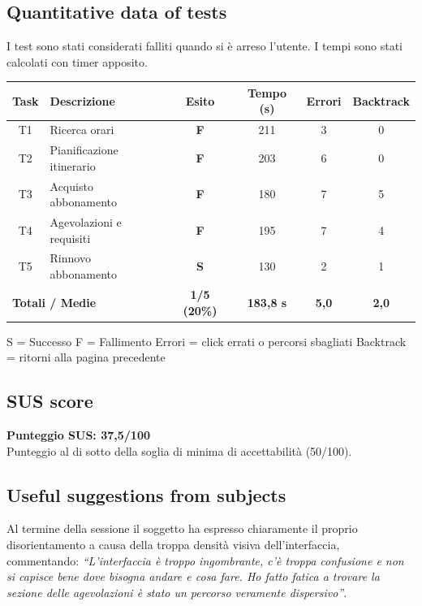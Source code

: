 ﻿\documentclass[11pt,a4paper]{article}
\begin{document}
\subsection*{Quantitative data of tests}
\begin{tcolorbox}[base]
I test sono stati considerati falliti quando si è arreso l'utente.
I tempi sono stati calcolati con timer apposito.
\begin{center}
\renewcommand{\arraystretch}{1.4}
\begin{tabular}{clcccc}
\toprule
\textbf{Task} & \textbf{Descrizione} &
\textbf{Esito} & \textbf{Tempo (s)} &
\textbf{Errori} & \textbf{Backtrack} \\
\midrule
T1 & Ricerca orari             & \textbf{F} & 211 & 3 & 0 \\
T2 & Pianificazione itinerario & \textbf{F} & 203 & 6 & 0 \\
T3 & Acquisto abbonamento      & \textbf{F} & 180 & 7 & 5 \\
T4 & Agevolazioni e requisiti  & \textbf{F} & 195 & 7 & 4 \\
T5 & Rinnovo abbonamento       & \textbf{S} & 130 & 2 & 1 \\
\midrule
\multicolumn{2}{l}{\textbf{Totali / Medie}} &
\textbf{1/5 (20\%)} & \textbf{183,8 s} &
\textbf{5,0} & \textbf{2,0} \\
\bottomrule
\end{tabular}
\end{center}

\vspace{0.3cm}
\small S = Successo \quad F = Fallimento \quad
Errori = click errati o percorsi sbagliati \quad
Backtrack = ritorni alla pagina precedente
\end{tcolorbox}

\subsection*{SUS score}
\begin{tcolorbox}[base]
\textbf{Punteggio SUS: 37,5/100}\\[0.2cm]
\small Punteggio al di sotto della soglia di minima di accettabilità
(50/100).
\end{tcolorbox}

\subsection*{Useful suggestions from subjects}
\begin{tcolorbox}[base]
Al termine della sessione il soggetto ha espresso chiaramente il proprio disorientamento a causa della troppa densità visiva dell'interfaccia, commentando:
\textit{``L'interfaccia è troppo ingombrante, c'è troppa confusione e non si capisce bene dove bisogna andare e cosa fare. Ho fatto fatica a trovare la sezione delle agevolazioni è stato un percorso veramente dispersivo''}.
\end{tcolorbox}
\end{document}
